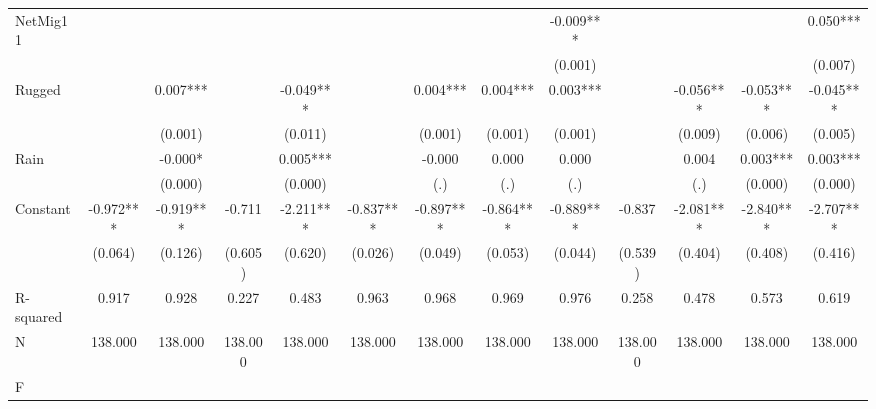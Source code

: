 {\begin{tabular}{l*{12}{c}}
NetMig11            &               &               &               &               &               &               &               &      -0.009***&               &               &               &       0.050***\\
                    &               &               &               &               &               &               &               &     (0.001)   &               &               &               &     (0.007)   \\
Rugged              &               &       0.007***&               &      -0.049***&               &       0.004***&       0.004***&       0.003***&               &      -0.056***&      -0.053***&      -0.045***\\
                    &               &     (0.001)   &               &     (0.011)   &               &     (0.001)   &     (0.001)   &     (0.001)   &               &     (0.009)   &     (0.006)   &     (0.005)   \\
Rain                &               &      -0.000*  &               &       0.005***&               &      -0.000   &       0.000   &       0.000   &               &       0.004   &       0.003***&       0.003***\\
                    &               &     (0.000)   &               &     (0.000)   &               &         (.)   &         (.)   &         (.)   &               &         (.)   &     (0.000)   &     (0.000)   \\
Constant            &      -0.972***&      -0.919***&      -0.711   &      -2.211***&      -0.837***&      -0.897***&      -0.864***&      -0.889***&      -0.837   &      -2.081***&      -2.840***&      -2.707***\\
                    &     (0.064)   &     (0.126)   &     (0.605)   &     (0.620)   &     (0.026)   &     (0.049)   &     (0.053)   &     (0.044)   &     (0.539)   &     (0.404)   &     (0.408)   &     (0.416)   \\
\hline
R-squared           &       0.917   &       0.928   &       0.227   &       0.483   &       0.963   &       0.968   &       0.969   &       0.976   &       0.258   &       0.478   &       0.573   &       0.619   \\
N                   &     138.000   &     138.000   &     138.000   &     138.000   &     138.000   &     138.000   &     138.000   &     138.000   &     138.000   &     138.000   &     138.000   &     138.000   \\
F                   &               &               &               &               &               &               &               &               &               &               &               &               \\
\hline\hline
\end{tabular}
}
